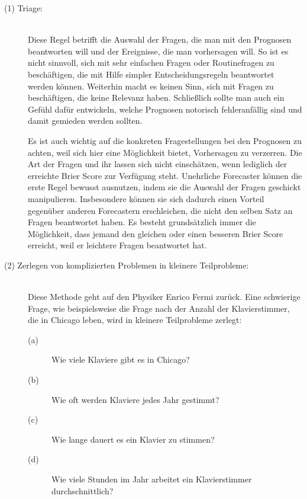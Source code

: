 \begin{description}

\item[(1) Triage:] \hfill \\
Diese Regel betrifft die Auswahl der Fragen, die man mit den Prognosen beantworten will und
der Ereignisse, die man vorhersagen will. So ist es nicht sinnvoll, sich mit sehr einfachen Fragen
oder Routinefragen zu beschäftigen, die mit Hilfe simpler Entscheidungsregeln beantwortet werden können.
Weiterhin macht es keinen Sinn, sich mit Fragen zu beschäftigen, die keine Relevanz haben. Schließlich
sollte man auch ein Gefühl dafür entwickeln, welche Prognosen notorisch fehleranfällig sind und damit
gemieden werden sollten.

Es ist auch wichtig auf die konkreten Fragestellungen bei den Prognosen zu achten, weil sich hier
eine Möglichkeit bietet, Vorhersagen zu verzerren. Die Art der Fragen und ihr \grqq{}
lassen sich nicht einschätzen, wenn lediglich der erreichte Brier Score zur Verfügung steht.
Unehrliche Forecaster können die erste Regel bewusst ausnutzen, indem sie die Auswahl der Fragen geschickt
manipulieren. Insbesondere können sie sich dadurch einen Vorteil gegenüber anderen Forecastern erschleichen,
die nicht den selben Satz an Fragen beantwortet haben. Es besteht grundsätzlich immer die Möglichkeit, dass
jemand den gleichen oder einen besseren Brier Score erreicht, weil er leichtere Fragen beantwortet hat.

\item[(2) Zerlegen von komplizierten Problemen in kleinere Teilprobleme:] \hfill \\
Diese Methode geht auf den Physiker Enrico Fermi zurück. Eine schwierige Frage, wie beispielsweise die
Frage nach der Anzahl der Klavierstimmer, die in Chicago leben, wird in kleinere Teilprobleme zerlegt:

\begin{description}

\item[(a)] Wie viele Klaviere gibt es in Chicago?
\item[(b)] Wie oft werden Klaviere jedes Jahr gestimmt?
\item[(c)] Wie lange dauert es ein Klavier zu stimmen?
\item[(d)] Wie viele Stunden im Jahr arbeitet ein Klavierstimmer durchschnittlich? 

\end{description}


\end{description}
